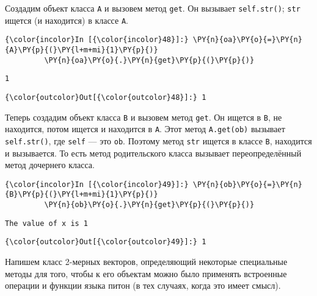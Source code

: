     Создадим объект класса \texttt{A} и вызовем метод \texttt{get}. Он
вызывает \texttt{self.str()}; \texttt{str} ищется (и находится) в классе
\texttt{A}.

    \begin{Verbatim}[commandchars=\\\{\}]
{\color{incolor}In [{\color{incolor}48}]:} \PY{n}{oa}\PY{o}{=}\PY{n}{A}\PY{p}{(}\PY{l+m+mi}{1}\PY{p}{)}
         \PY{n}{oa}\PY{o}{.}\PY{n}{get}\PY{p}{(}\PY{p}{)}
\end{Verbatim}

    \begin{Verbatim}[commandchars=\\\{\}]
1

    \end{Verbatim}

            \begin{Verbatim}[commandchars=\\\{\}]
{\color{outcolor}Out[{\color{outcolor}48}]:} 1
\end{Verbatim}
        
    Теперь создадим объект класса \texttt{B} и вызовем метод \texttt{get}.
Он ищется в \texttt{B}, не находится, потом ищется и находится в
\texttt{A}. Этот метод \texttt{A.get(ob)} вызывает \texttt{self.str()},
где \texttt{self} --- это \texttt{ob}. Поэтому метод \texttt{str} ищется в
классе \texttt{B}, находится и вызывается. То есть метод родительского
класса вызывает переопределённый метод дочернего класса.

    \begin{Verbatim}[commandchars=\\\{\}]
{\color{incolor}In [{\color{incolor}49}]:} \PY{n}{ob}\PY{o}{=}\PY{n}{B}\PY{p}{(}\PY{l+m+mi}{1}\PY{p}{)}
         \PY{n}{ob}\PY{o}{.}\PY{n}{get}\PY{p}{(}\PY{p}{)}
\end{Verbatim}

    \begin{Verbatim}[commandchars=\\\{\}]
The value of x is 1

    \end{Verbatim}

            \begin{Verbatim}[commandchars=\\\{\}]
{\color{outcolor}Out[{\color{outcolor}49}]:} 1
\end{Verbatim}
        
    Напишем класс 2-мерных векторов, определяющий некоторые специальные
методы для того, чтобы к его объектам можно было применять встроенные
операции и функции языка питон (в тех случаях, когда это имеет смысл).

